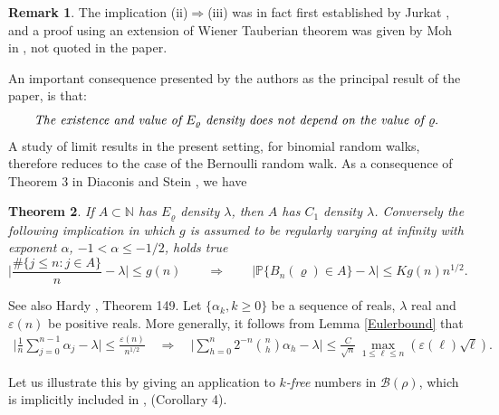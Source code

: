 \documentclass[11pt,draft,reqno]{amsart}
\newtheorem{theorem}{Theorem}[section]
\theoremstyle{definition}
\theoremstyle{remarks}
\newtheorem{remark}[theorem]{{\bf  Remark}}
\numberwithin{equation}{section}
\def \a{{\alpha}}
\def \e{{\varepsilon}}
\def \l{{\lambda}}
\def \qq{{\qquad}}
\def\P{{\mathcal P}}
\def\P{{\mathbb P}}
\def\N{{\mathbb N}}
\begin{document}
\begin{remark} \rm The implication (ii)$\Rightarrow$(iii) was in fact
 first established by Jurkat \cite{J}, and a
proof   using an extension of Wiener Tauberian theorem was given by
Moh in \cite{Mo}, not quoted in the paper. 
\end{remark}\vskip 2pt 
An important consequence presented by the authors as the principal  result of the paper,  is   that:
\begin{equation} \label{E.rho} \hbox{\it  The existence and value of ${  E}_\varrho$ density does not depend on
the value of $\varrho$}.  
\end{equation}  
A study of limit results in the present setting, for binomial random walks,  therefore reduces to the case of the Bernoulli random walk. 
As a consequence of  Theorem 3  in Diaconis and Stein  \cite{DS}, we have
\begin{theorem} If $A\subset \N$ has $E_\varrho$ density $\l$, then $A$ has $C_1$ density $\l$. Conversely the following implication  in which   $g$ is assumed to be regularly varying at infinity with exponent $\a$, $-1<\a\le -1/2$, holds true 
\begin{equation} \label{ 2}   
   \Big|\frac{\#\{ j\le n: j\in A\}}{n}- \l\Big|\le g(n)\qquad\!\!\!\!\!\Longrightarrow  \qquad\!\!\!\!\!  \Big|\P\{B_n(\varrho) \in A\} - \l\Big|\le K g(n)n^{1/2}. 
 \end{equation}
 \end{theorem}
See also Hardy \cite{H1},    Theorem 149.  
 Let
$\{\a_k, k\ge 0\}$ be a  sequence of reals, $\l$ real and $\e(n)$ be positive reals. More generally, it follows from  Lemma \ref{Eulerbound} that 
 \begin{eqnarray*} \label{4.61c}\Big|\frac{1}{n}\sum_{j=0}^{n-1}\a_j- \l \Big|\le \frac{\e(n)}{n^{ 1/2} }
\quad \Longrightarrow \quad  \Big| \sum_{h=0}^n   2^{-n}  
{{n}\choose{h}}\a_h-\l \Big|  \le   \frac{C}{ \sqrt n}\, \max_{1\le \ell\le n} (\e(\ell) \sqrt \ell)     .\end{eqnarray*}
   
 
Let us illustrate this by giving an application to {\it $k$-free} numbers in $\mathcal B(\rho)$, which is implicitly included in \cite{DS}, (Corollary 4).
   
\end{document}
